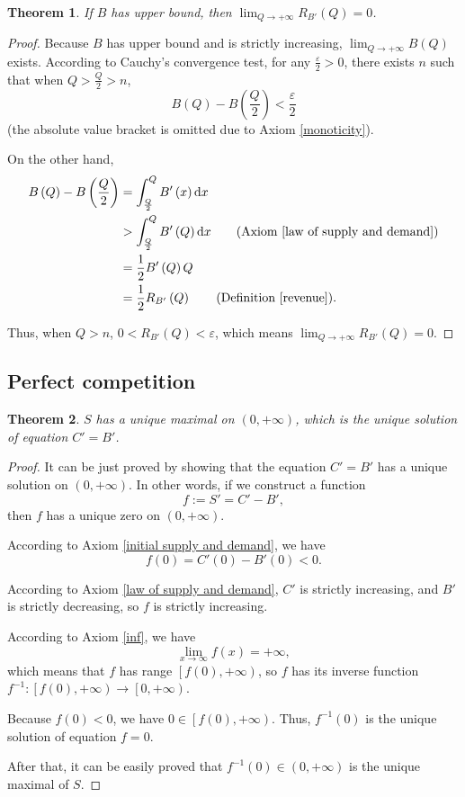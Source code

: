 \documentclass{article}
\newtheorem{theorem}{Theorem}
\begin{document}
\begin{theorem}
If $B$ has upper bound, then $\lim_{Q\to+\infty}R_{B'}\left(Q\right)=0$.
\end{theorem}
\begin{proof}
Because $B$ has upper bound and is strictly increasing, $\lim_{Q\to+\infty}B\left(Q\right)$ exists.
According to Cauchy's convergence test, for any $\frac\varepsilon2>0$, there exists $n$ such that
when $Q>\frac Q2>n$,
$$B\left(Q\right)-B\left(\frac Q2\right)<\frac\varepsilon2$$
(the absolute value bracket is omitted due to Axiom \ref{monoticity}).

On the other hand,
\begin{align*}
B\left(Q\right)-B\left(\frac Q2\right)&=\int_{\frac Q2}^QB'\left(x\right)\mathrm dx\\
&>\int_{\frac Q2}^QB'\left(Q\right)\mathrm dx\qquad\text{(Axiom \ref{law of supply and demand})}\\
&=\frac12B'\left(Q\right)Q\\
&=\frac12R_{B'}\left(Q\right)\qquad\text{(Definition \ref{revenue})}.
\end{align*}

Thus, when $Q>n$, $0<R_{B'}\left(Q\right)<\varepsilon$, which means $\lim_{Q\to+\infty}R_{B'}\left(Q\right)=0$.
\end{proof}

\subsection{Perfect competition}
\label{perfect competition}

\begin{theorem}
\label{perfect competition equilibrium}
$S$ has a unique maximal on $\left(0,+\infty\right)$,
which is the unique solution of equation $C'=B'$.
\end{theorem}
\begin{proof}
It can be just proved by showing that the equation $C'=B'$ has a unique solution on $\left(0,+\infty\right)$.
In other words, if we construct a function $$f:=S'=C'-B',$$ then $f$ has a unique zero on $\left(0,+\infty\right)$.

According to Axiom \ref{initial supply and demand}, we have
$$f\left(0\right)=C'\left(0\right)-B'\left(0\right)<0.$$

According to Axiom \ref{law of supply and demand}, $C'$ is strictly increasing, and $B'$ is strictly decreasing, so $f$ is strictly increasing.

According to Axiom \ref{inf}, we have
$$\lim_{x\to\infty}f\left(x\right)=+\infty,$$
which means that $f$ has range $\left[f\left(0\right),+\infty\right)$,
so $f$ has its inverse function $f^{-1}:\left[f\left(0\right),+\infty\right)\to\left[0,+\infty\right)$.

Because $f\left(0\right)<0$, we have $0\in\left[f\left(0\right),+\infty\right)$.
Thus, $f^{-1}\left(0\right)$ is the unique solution of equation $f=0$.

After that, it can be easily proved that $f^{-1}\left(0\right)\in\left(0,+\infty\right)$ is the unique maximal of $S$.
\end{proof}
\end{document}
